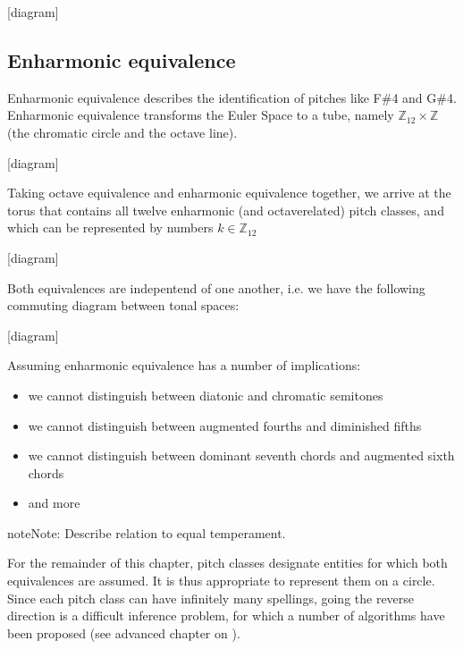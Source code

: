 \documentclass[letterpaper,10pt,english]{sphinxmanual}
\begin{document}
{[}diagram{]}


\subsection{Enharmonic equivalence}
\label{\detokenize{3_set_theory:enharmonic-equivalence}}
Enharmonic equivalence describes the identification of pitches like F\#4 and G\#4.
Enharmonic equivalence transforms the Euler Space to a tube, namely \(\mathbb{Z}_{12} \times \mathbb{Z}\)
(the chromatic circle and the octave line).

{[}diagram{]}

Taking octave equivalence and enharmonic equivalence together,
we arrive at the torus that contains all twelve enharmonic (and octave\sphinxhyphen{}related) pitch classes,
and which can be represented by numbers \(k\in \mathbb{Z}_{12}\)

{[}diagram{]}

Both equivalences are indepentend of one another, i.e. we have the following commuting diagram between tonal spaces:

{[}diagram{]}

Assuming enharmonic equivalence has a number of implications:
\begin{itemize}
\item {} 
we cannot distinguish between diatonic and chromatic semitones

\item {} 
we cannot distinguish between augmented fourths and diminished fifths

\item {} 
we cannot distinguish between dominant seventh chords and augmented sixth chords

\item {} 
and more

\end{itemize}

\begin{sphinxadmonition}{note}{Note:}
Describe relation to equal temperament.
\end{sphinxadmonition}

For the remainder of this chapter, pitch classes designate entities for which both equivalences are assumed.
It is thus appropriate to represent them on a circle. Since each pitch class can have infinitely many spellings,
going the reverse direction is a difficult inference problem, for which a number of algorithms have been proposed
(see advanced chapter on {\hyperref[\detokenize{6_advanced:pitch-spelling}]{}}).
\end{document}
